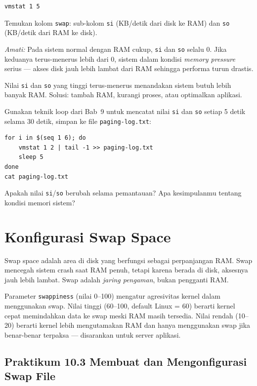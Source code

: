 \begin{lstlisting}[caption={Statistik memori virtual}]
vmstat 1 5
\end{lstlisting}

Temukan kolom \texttt{swap}: sub-kolom \texttt{si} (KB/detik dari disk ke RAM) dan
\texttt{so} (KB/detik dari RAM ke disk).

\textit{Amati:} Pada sistem normal dengan RAM cukup, \texttt{si} dan \texttt{so}
selalu 0. Jika keduanya terus-menerus lebih dari 0, sistem dalam kondisi
\textit{memory pressure} serius --- akses disk jauh lebih lambat dari RAM sehingga
performa turun drastis.

\begin{warningbox}
Nilai \texttt{si} dan \texttt{so} yang tinggi terus-menerus menandakan sistem butuh
lebih banyak RAM. Solusi: tambah RAM, kurangi proses, atau optimalkan aplikasi.
\end{warningbox}

\begin{challengebox}
Gunakan teknik loop dari Bab~9 untuk mencatat nilai \texttt{si} dan \texttt{so}
setiap 5 detik selama 30 detik, simpan ke file \texttt{paging-log.txt}:
\begin{lstlisting}
for i in $(seq 1 6); do
    vmstat 1 2 | tail -1 >> paging-log.txt
    sleep 5
done
cat paging-log.txt
\end{lstlisting}
Apakah nilai \texttt{si}/\texttt{so} berubah selama pemantauan? Apa kesimpulanmu
tentang kondisi memori sistem?
\end{challengebox}

\section{Konfigurasi Swap Space}

Swap space adalah area di disk yang berfungsi sebagai perpanjangan RAM. Swap mencegah
sistem crash saat RAM penuh, tetapi karena berada di disk, aksesnya jauh lebih lambat.
Swap adalah \textit{jaring pengaman}, bukan pengganti RAM.

Parameter \texttt{swappiness} (nilai 0--100) mengatur agresivitas kernel dalam
menggunakan swap. Nilai tinggi (60--100, default Linux = 60) berarti kernel cepat
memindahkan data ke swap meski RAM masih tersedia. Nilai rendah (10--20) berarti
kernel lebih mengutamakan RAM dan hanya menggunakan swap jika benar-benar terpaksa
--- disarankan untuk server aplikasi.

\subsection*{Praktikum 10.3 Membuat dan Mengonfigurasi Swap File}

